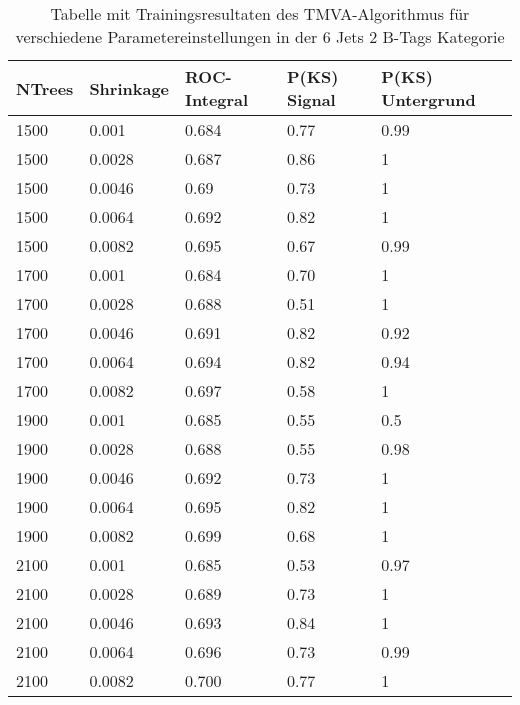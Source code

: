\begin{table}[tbp]\parbox{12cm}{
  \caption[TMVA 6j2t Ergebnisse]{Tabelle mit Trainingsresultaten des TMVA-Algorithmus f\"ur verschiedene Parametereinstellungen in der 6 Jets 2 B-Tags Kategorie}%
  }\label{tab:tmva_6j2t}
  \begin{center}
  \begin{tabular}{lllll}
  \hline
  NTrees & Shrinkage & ROC-Integral & P(KS) Signal & P(KS) Untergrund\\
  \hline
\num{1500} & \num{0.001}  & \num{0,684} & \num{0,77} & \num{0,99}\\
\num{1500} & \num{0.0028} & \num{0,687} & \num{0,86} & \num{1}\\
\num{1500} & \num{0.0046} & \num{0,69}  & \num{0,73} & \num{1}\\
\num{1500} & \num{0.0064} & \num{0,692} & \num{0,82} & \num{1}\\
\num{1500} & \num{0.0082} & \num{0,695} & \num{0,67} & \num{0,99}\\
\num{1700} & \num{0.001}  & \num{0,684} & \num{0,70} & \num{1}\\
\num{1700} & \num{0.0028} & \num{0,688} & \num{0,51} & \num{1}\\
\num{1700} & \num{0.0046} & \num{0,691} & \num{0,82} & \num{0,92}\\
\num{1700} & \num{0.0064} & \num{0,694} & \num{0,82} & \num{0,94}\\
\num{1700} & \num{0.0082} & \num{0,697} & \num{0,58} & \num{1}\\
\num{1900} & \num{0.001}  & \num{0,685} & \num{0,55} & \num{0,5}\\
\num{1900} & \num{0.0028} & \num{0,688} & \num{0,55} & \num{0,98}\\
\num{1900} & \num{0.0046} & \num{0,692} & \num{0,73} & \num{1}\\
\num{1900} & \num{0.0064} & \num{0,695} & \num{0,82} & \num{1}\\
\num{1900} & \num{0.0082} & \num{0,699} & \num{0,68} & \num{1}\\
\num{2100} & \num{0.001}  & \num{0,685} & \num{0,53} & \num{0,97}\\
\num{2100} & \num{0.0028} & \num{0,689} & \num{0,73} & \num{1}\\
\num{2100} & \num{0.0046} & \num{0,693} & \num{0,84} & \num{1}\\
\num{2100} & \num{0.0064} & \num{0,696} & \num{0,73} & \num{0,99}\\
\num{2100} & \num{0.0082} & \num{0,700} & \num{0,77} & \num{1}\\

\end{tabular}
\end{center}
\end{table}
